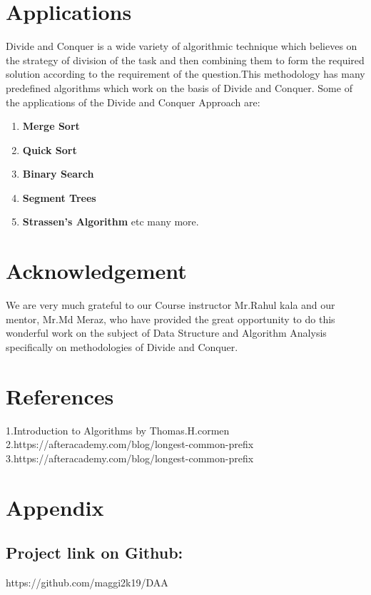\documentclass{article}
\begin{document}
\begin{multicols}{2}
\section{Applications}
Divide and Conquer is a wide variety of algorithmic technique which believes on the strategy of division of the task and then combining them to form the required solution according to the requirement of the question.This methodology has many predefined algorithms which work on the basis of Divide and Conquer. Some of the applications of the Divide and Conquer Approach are:

\begin{enumerate}
\item \textbf{Merge Sort}
\item \textbf{Quick Sort}
\item \textbf{Binary Search} 
\item \textbf{Segment Trees} 
\item  \textbf{Strassen’s Algorithm} etc many more.
\end{enumerate}

\section{Acknowledgement}
We are very much grateful to our Course instructor Mr.Rahul kala and our mentor, Mr.Md Meraz, who have provided the great opportunity to do this wonderful work on the subject of Data Structure and Algorithm Analysis specifically on methodologies of Divide and Conquer.

\section{References}
\begin{enumerate}
1.Introduction to Algorithms by Thomas.H.cormen\newline
2.https://afteracademy.com/blog/longest-common-prefix\newline
3.https://afteracademy.com/blog/longest-common-prefix \newline
\end{enumerate}

\section{Appendix}
\subsection{Project link on Github:}
https://github.com/maggi2k19/DAA

\end{multicols}
\end{document}
